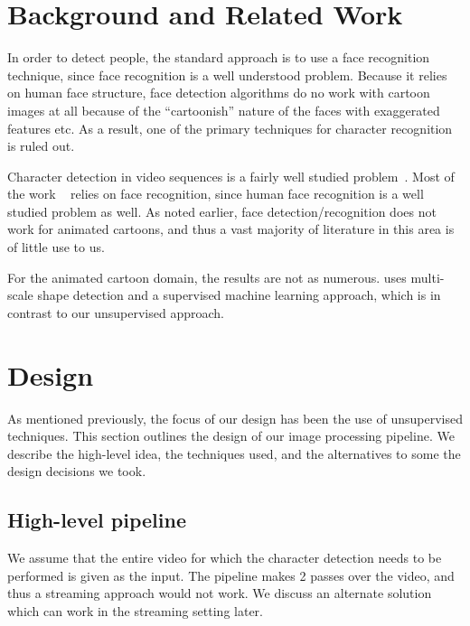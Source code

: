 \documentclass[10pt,twocolumn,letterpaper]{article}
\begin{document}
\section{Background and Related Work}

In order to detect people, the standard approach is to use a face
recognition technique, since face recognition is a well understood
problem. Because it relies on human face structure, face detection
algorithms do no work with cartoon images at all because of the
``cartoonish'' nature of the faces with exaggerated features etc. As a
result, one of the primary techniques for character recognition is
ruled out. 

Character detection in video sequences is a fairly well studied
problem~\cite{everingham2009taking,
  satoh1999name,snoek2008concept,sivic2005person}. Most of the work
~\cite{arandjelovic2005automatic} relies on face recognition, since
human face recognition is a well studied problem as well. As noted
earlier, face detection/recognition does not work for animated
cartoons, and thus a vast majority of literature in this area is of
little use to us.

For the animated cartoon domain, the results are not as
numerous. \cite{zhang20132} uses multi-scale shape detection and a
supervised machine learning approach, which is in contrast to our
unsupervised approach.



\section{Design}
As mentioned previously, the focus of our design has been the use of
unsupervised techniques. This section outlines the design of our image
processing pipeline. We describe the high-level idea, the techniques
used, and the alternatives to some the design decisions we took.

\subsection{High-level pipeline}
We assume that the entire video for which the character detection
needs to be performed is given as the input. The pipeline makes 2
passes over the video, and thus a streaming approach would not
work. We discuss an alternate solution which can work in the streaming
setting later.
\end{document}
